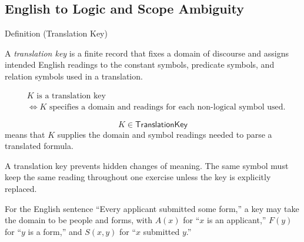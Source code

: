 
\subsection*{English to Logic and Scope Ambiguity}

\begin{definitionbox}{Definition (Translation Key)}
\begin{definition}
\label{def:translation-key-predicate-logic}
A \emph{translation key} is a finite record that fixes a domain of discourse and
assigns intended English readings to the constant symbols, predicate symbols,
and relation symbols used in a translation.
\end{definition}
\end{definitionbox}

\begin{remark*}
\[
\begin{aligned}
&K \text{ is a translation key}\\
&\Longleftrightarrow
K \text{ specifies a domain and readings for each non-logical symbol used.}
\end{aligned}
\]
\end{remark*}

\begin{remark*}
\[
  K\in\mathsf{TranslationKey}
\] means that \(K\) supplies the domain and
symbol readings needed to parse a translated formula.
\end{remark*}

\begin{remark*}[Interpretation]
A translation key prevents hidden changes of meaning. The same symbol must keep
the same reading throughout one exercise unless the key is explicitly replaced.
\end{remark*}

\begin{remark*}[Examples]
For the English sentence ``Every applicant submitted some form,'' a key may
take the domain to be people and forms, with \(A(x)\) for ``\(x\) is an
applicant,'' \(F(y)\) for ``\(y\) is a form,'' and \(S(x,y)\) for ``\(x\)
submitted \(y\).''
\end{remark*}


